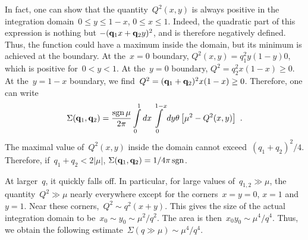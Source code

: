 \documentclass[preprint,aps,prb]{revtex4}
\begin{document}
In fact, one can show that the quantity~$Q^2(x, y)$ is always positive
in the integration domain~$0 \leq y \leq 1 - x$, $0 \leq x \leq 1$. 
Indeed, the quadratic part of this expression is nothing but
$-({\bf q}_1 x + {\bf q}_2 y)^2$, and is therefore negatively 
defined. Thus, the function could have a maximum inside the domain, 
but its minimum is achieved at the boundary. 
At the~$x = 0$ boundary, $Q^2(x, y) = q_1^2 y (1 - y)0$, 
which is positive for~$0 < y < 1$. 
At the~$y = 0$ boundary, $Q^2 = q_2^2 x (1 - x) \geq 0$. 
At the~$y = 1 - x$ boundary, we find~$Q^2 = ({\bf q}_1 + {\bf q}_2)^2
x(1 - x) \geq 0 $. Therefore, one can write
\begin{equation}
\Sigma({\bf q}_1, {\bf q}_2) 
= \frac{\mathop{\rm sgn}\mu}{2\pi} 
\int\limits_{0}^{1}dx
\int\limits_{0}^{1 - x}dy 
\theta\left[\mu^2 - Q^2(x, y)\right]
\ . 
\end{equation}
The maximal value of~$Q^2(x, y)$ inside the domain cannot 
exceed~$(q_1 + q_2)^2/4$. Therefore, if~$q_1 + q_2 < 2|\mu|$, 
$\Sigma({\bf q}_1, {\bf q}_2) = 1/4\pi \mathop{\rm sgn}\nolimits$.

At larger~$q$, it quickly falls off. In particular, 
for large values of~$q_{1, 2} \gg \mu$, the quantity~$Q^2 \gg \mu$ 
nearly everywhere except for the corners~$x = y = 0$, $x = 1$ and~$y =
1$. Near these corners,~$Q^2 \sim q^2 (x + y)$. This gives the 
size of the actual integration domain to be~$x_0 \sim y_0 \sim \mu^2 /
q^2$. The area is then~$x_0 y_0 \sim \mu^4/q^4$. Thus, we obtain the
following estimate~$\Sigma (q\gg \mu) \sim \mu^4 / q^4$. 
\end{document}
